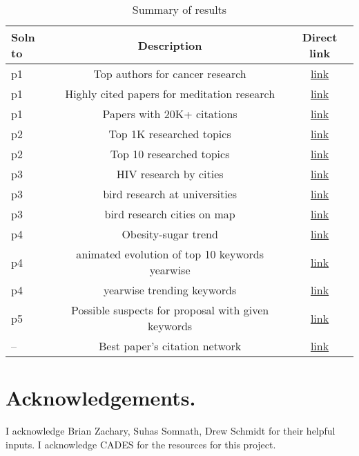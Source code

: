\documentclass{article}
\begin{document}
\begin{table}
\begin{center}
\begin{tabular}{|l|c|c|}
\hline
\textbf{Soln to} & \textbf{Description} & \textbf{Direct link} \\
\hline
p1 & Top authors for cancer research & \href{https://github.com/ketancmaheshwari/SMC18/blob/master/results/cancer_research_topauths.txt}{link} \\
p1 & Highly cited papers for meditation research & \href{https://github.com/ketancmaheshwari/SMC18/blob/master/results/meditation_highly_cited.txt}{link} \\
p1 & Papers with 20K+ citations & \href{https://github.com/ketancmaheshwari/SMC18/blob/master/results/top_papers.txt}{link} \\
p2 & Top 1K researched topics & \href{https://github.com/ketancmaheshwari/SMC18/blob/master/results/top_1K_words_kw_abs_title.txt}{link} \\
p2 & Top 10 researched topics & \href{https://github.com/ketancmaheshwari/SMC18/blob/master/results/top_10_keywords_by_freq.txt}{link} \\
p3 & HIV research by cities & \href{https://github.com/ketancmaheshwari/SMC18/blob/master/results/HIV_AIDS_Research_Cities.txt
}{link} \\
p3 & bird research at universities & \href{https://github.com/ketancmaheshwari/SMC18/blob/master/results/birds_research_at_univs.txt}{link} \\
p3 & bird research cities on map & \href{https://github.com/ketancmaheshwari/SMC18/blob/master/results/bird_research_cities.png}{link} \\
p4 & Obesity-sugar trend & \href{https://github.com/ketancmaheshwari/SMC18/blob/master/results/obesity_sugar.pdf}{link} \\
p4 & animated evolution of top 10 keywords yearwise & \href{https://github.com/ketancmaheshwari/SMC18/blob/master/results/freqwordsoveryears.mkv}{link} \\
p4 & yearwise trending keywords & \href{https://github.com/ketancmaheshwari/SMC18/blob/master/results/yearwise_trending_keywords.txt}{link} \\
p5 & Possible suspects for proposal with given keywords & \href{https://github.com/ketancmaheshwari/SMC18/blob/master/results/suspects.txt}{link} \\
-- & Best paper's citation network & \href{https://github.com/ketancmaheshwari/SMC18/blob/master/results/best_papers.svg}{link} \\
\hline
\end{tabular}
\end{center}
\caption{Summary of results}
\label{tbl:results}
\end{table}

\section*{Acknowledgements.}
I acknowledge Brian Zachary, Suhas Somnath, Drew Schmidt for their helpful
inputs. I acknowledge CADES for the resources for this project.
\end{document}
